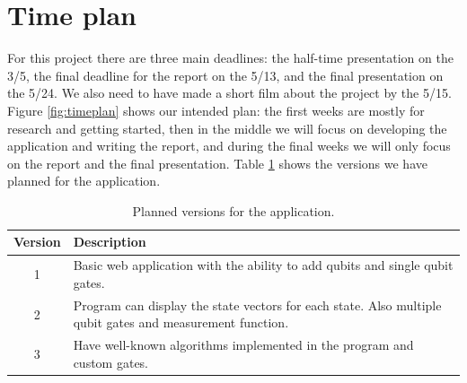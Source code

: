 \section{Time plan}


For this project there are three main deadlines: the half-time presentation on the 3/5, the final deadline for the report on the 5/13, and the final presentation on the 5/24.
We also need to have made a short film about the project by the 5/15.
Figure \ref{fig:timeplan} shows our intended plan: the first weeks are mostly for research and getting started, then in the middle we will focus on developing the application and writing the report, and during the final weeks we will only focus on the report and the final presentation.
Table \ref{tab:milestones} shows the versions we have planned for the application.

\begin{table}[h]
    \centering
    \begin{tabular}{|c|p{135mm}|}
    \hline
       Version  & Description \\
       \hline
        1 & Basic web application with the ability to add qubits and single qubit gates. \\ \hline
        2 & Program can display the state vectors for each state. Also multiple qubit gates and measurement function.\\ \hline
        3 & Have well-known algorithms implemented in the program and custom gates. \\ \hline
        
    \end{tabular}
    \caption{Planned versions for the application.}
    \label{tab:milestones}
\end{table}

